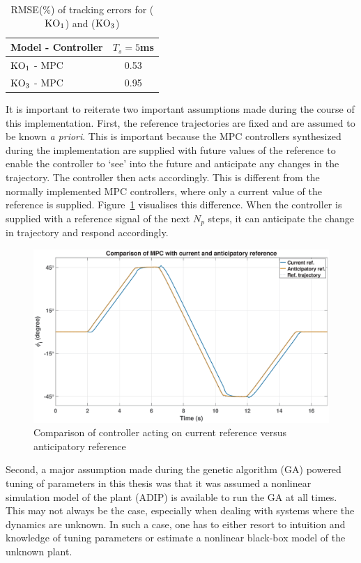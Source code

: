 % 
% 
\vspace{-0.5cm}
\begin{table}[H]
    \centering
    \begin{tabular}{lc}
         \toprule
         Model - Controller                  & $T_s = 5$ms\\
         \midrule
         $\textup{KO}_1$ - MPC               & 0.53\\
         $\textup{KO}_3$ - MPC               & 0.95\\
         \bottomrule
    \end{tabular}
    \caption{RMSE(\%) of tracking errors for ($\textup{KO}_1$) and ($\textup{KO}_3$)}
    \label{tab:RMSE_3}
\end{table}
\vspace{-0.5cm}
It is important to reiterate two important assumptions made during the course of this implementation. First, the reference trajectories are fixed and are assumed to be known \textit{a priori}. This is important because the MPC controllers synthesized during the implementation are supplied with future values of the reference to enable the controller to `see' into the future and anticipate any changes in the trajectory. The controller then acts accordingly. This is different from the normally implemented MPC controllers, where only a current value of the reference is supplied. Figure~\ref{fig:antici} visualises this difference. When the controller is supplied with a reference signal of the next $N_p$ steps, it can anticipate the change in trajectory and respond accordingly. 
% 
\begin{figure}[H]
    \centering
    \includegraphics[width=1\linewidth]{figures/anticipatory}
    \caption{Comparison of controller acting on current reference versus anticipatory reference}
    \label{fig:antici}
\end{figure}
% 
\vspace{-0.55cm}
Second, a major assumption made during the genetic algorithm (GA) powered tuning of parameters in this thesis was that it was assumed a nonlinear simulation model of the plant (ADIP) is available to run the GA at all times. This may not always be the case, especially when dealing with systems where the dynamics are unknown. In such a case, one has to either resort to intuition and knowledge of tuning parameters or estimate a nonlinear black-box model of the unknown plant.
\vspace{-0.20cm}



